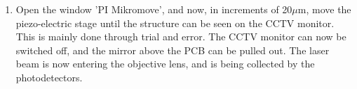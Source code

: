 \documentclass[14pt,a4paper] {article}
\begin{document}
\begin{enumerate}
\item Open the window 'PI Mikromove', and now, in increments of 20$\mu$m, move the piezo-electric stage until the structure can be seen on the CCTV monitor. This is mainly done through trial and error. The CCTV monitor can now be switched off, and the mirror above the PCB can be pulled out. The laser beam is now entering the objective lens, and is being collected by the photodetectors.
   
\end{enumerate}


\begin{figure}
\begin{minipage}[h]{0.5\linewidth}
\end{minipage}
\hfill
\begin{minipage}[h]{0.5\linewidth}

\end{minipage}
\end{figure}
\end{document}

